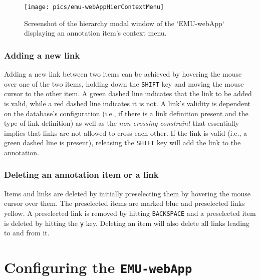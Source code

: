 \documentclass[]{book}
\begin{document}
\begin{figure}

{\centering \texttt{[image: pics/emu-webAppHierContextMenu]} 

}

\caption{Screenshot of the hierarchy modal window of the `EMU-webApp` displaying an annotation item's context menu.}\label{fig:webApp-hierContextMenu}
\end{figure}

\hypertarget{adding-a-new-link}{%
\subsubsection{Adding a new link}\label{adding-a-new-link}}

Adding a new link between two items can be achieved by hovering the mouse over one of the two items, holding down the \texttt{SHIFT} key and moving the mouse cursor to the other item. A green dashed line indicates that the link to be added is valid, while a red dashed line indicates it is not. A link's validity is dependent on the database's configuration (i.e., if there is a link definition present and the type of link definition) as well as the \emph{non-crossing constraint} \citep{coleman:lp1991a} that essentially implies that links are not allowed to cross each other. If the link is valid (i.e., a green dashed line is present), releasing the \texttt{SHIFT} key will add the link to the annotation.

\hypertarget{deleting-an-annotation-item-or-a-link}{%
\subsubsection{Deleting an annotation item or a link}\label{deleting-an-annotation-item-or-a-link}}

Items and links are deleted by initially preselecting them by hovering the mouse cursor over them. The preselected items are marked blue and preselected links yellow. A preselected link is removed by hitting \texttt{BACKSPACE} and a preselected item is deleted by hitting the \texttt{y} key. Deleting an item will also delete all links leading to and from it.

\hypertarget{configuring-the-emu-webapp}{%
\section{\texorpdfstring{Configuring the \texttt{EMU-webApp}}{Configuring the EMU-webApp}}\label{configuring-the-emu-webapp}}
\end{document}
